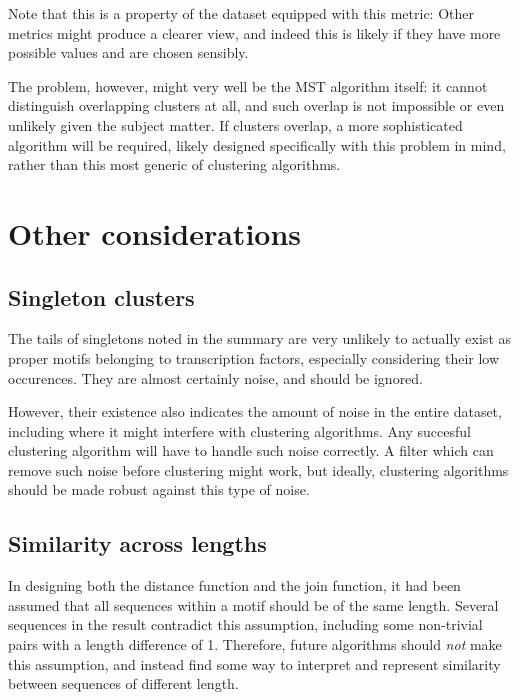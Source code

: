 \documentclass[fleqn]{book}
\begin{document}
Note that this is a property of the dataset equipped with this metric:
Other metrics might produce a clearer view, and indeed this is likely if
they have more possible values and are chosen sensibly.

The problem, however, might very well be the MST algorithm itself: it
cannot distinguish overlapping clusters at all, and such overlap is not
impossible or even unlikely given the subject matter. If clusters
overlap, a more sophisticated algorithm will be required, likely
designed specifically with this problem in mind, rather than this most
generic of clustering algorithms.

\section{Other considerations}\label{other-considerations}

\subsection{Singleton clusters}\label{singleton-clusters}

The tails of singletons noted in the summary are very unlikely to
actually exist as proper motifs belonging to transcription factors,
especially considering their low occurences. They are almost certainly
noise, and should be ignored.

However, their existence also indicates the amount of noise in the
entire dataset, including where it might interfere with clustering
algorithms. Any succesful clustering algorithm will have to handle such
noise correctly. A filter which can remove such noise before clustering
might work, but ideally, clustering algorithms should be made robust
against this type of noise.

\subsection{Similarity across lengths}\label{similarity-across-lengths}

In designing both the distance function and the join function, it had
been assumed that all sequences within a motif should be of the same
length. Several sequences in the result contradict this assumption,
including some non-trivial pairs with a length difference of 1.
Therefore, future algorithms should \emph{not} make this assumption, and
instead find some way to interpret and represent similarity between
sequences of different length.
\end{document}
